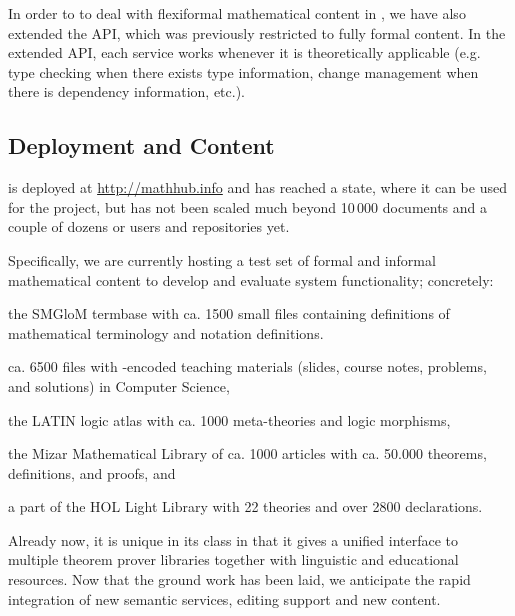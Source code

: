 In order to to deal with flexiformal mathematical content in \omdoc, we have also extended
the \mmt API, which was previously restricted to fully formal content. In the extended
\mmt API, each \mmt service works whenever it is theoretically applicable (e.g. type
checking when there exists type information, change management when there is dependency
information, etc.).

\subsection{Deployment and Content}

\sys is deployed at \url{http://mathhub.info} and has reached a state, where it can be
used for the \pn project, but has not been scaled much beyond 10\,000 documents and a
couple of dozens or users and repositories yet.

Specifically, we are currently hosting a test set of formal and informal mathematical
content to develop and evaluate system functionality; concretely:
\begin{compactenum}[\em i\rm)]
\item the SMGloM termbase with ca. 1500 small \sTeX files containing definitions of
  mathematical terminology and notation definitions.
\item ca. 6500 files with \sTeX-encoded teaching materials (slides, course notes,
  problems, and solutions) in Computer Science,
\item the LATIN logic atlas with ca. 1000 meta-theories and logic morphisms,
\item the Mizar Mathematical Library of ca. 1000 articles with ca. 50.000 theorems,
  definitions, and proofs, and
\item a part of the HOL Light Library with 22 theories and over 2800 declarations.
\end{compactenum}
Already now, it is unique in its class in that it gives a unified interface to multiple
theorem prover libraries together with linguistic and educational resources. Now that the
ground work has been laid, we anticipate the rapid integration of new semantic services,
editing support and new content.




